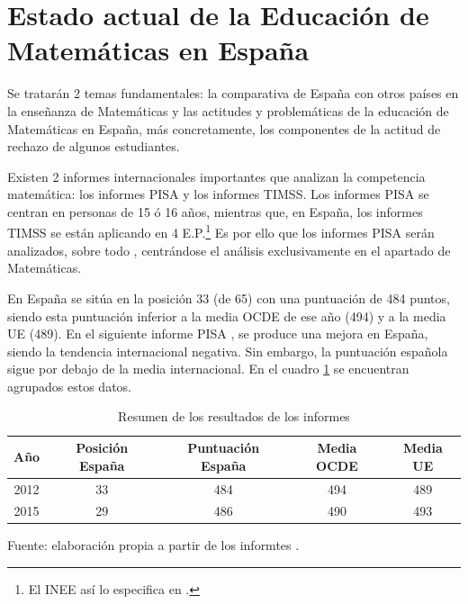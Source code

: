 

\label{chap:intro} %


\section{Estado actual de la Educación de Matemáticas en España}
\label{sec:EstadoEducacionMates}

Se tratarán 2 temas fundamentales: la comparativa de España con otros países en la enseñanza de Matemáticas y las actitudes y problemáticas de la educación de Matemáticas en España, más concretamente, los componentes de la actitud de rechazo de algunos estudiantes.



Existen 2 informes internacionales importantes que analizan la competencia matemática: los informes \gls{PISA} y los informes \gls{TIMSS}. 
%
%
Los informes \gls{PISA} se centran en personas de 15 ó 16 años, mientras que, en España, los informes \gls{TIMSS} se están aplicando en 4 E.P.\footnote{El \gls{INEE} así lo especifica en \cite{InformeTimss}.} 
%
Es por ello que los informes \gls{PISA} serán analizados, sobre todo , centrándose el análisis exclusivamente en el apartado de Matemáticas.

En  España se sitúa en la posición 33 (de 65) con una puntuación de 484 puntos, siendo esta puntuación inferior a la media OCDE de ese año (494) y a la media UE (489).
%
En el siguiente informe PISA , se produce una mejora en España, siendo la tendencia internacional negativa. 
%
Sin embargo, la puntuación española sigue por debajo de la media internacional.
%
En el cuadro \ref{tbl::ResumenPisa} se encuentran agrupados estos datos.

\begin{table}[hbtp]
\centering
\caption{Resumen de los resultados de los informes }
\label{tbl::ResumenPisa}
\begin{tabular}{c|cccc}
Año & Posición España & Puntuación España & Media OCDE & Media UE\\\hline
2012 & 33 & 484 & 494 & 489\\
2015 & 29 & 486 & 490 & 493
\end{tabular}
\vspace{0.3cm}

\small{Fuente: elaboración propia a partir de los informtes .}
\end{table}

